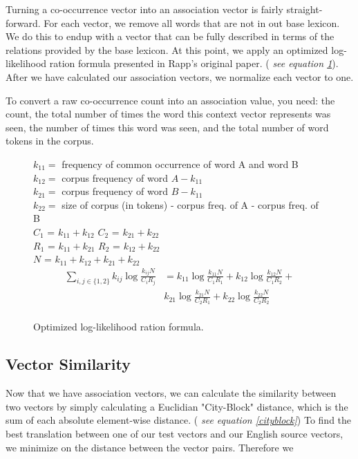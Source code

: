 \documentclass[12pt]{article}
\begin{document}
Turning a co-occurrence vector into an association vector is fairly straight-forward. For each vector, we remove all words that are not in out base lexicon. We do this to endup with a vector that can be fully described in terms of the relations provided by the base lexicon. At this point, we apply an optimized log-likelihood ration formula presented in Rapp's original paper. (\emph{ see equation \ref{loglike}}). After we have calculated our association vectors, we normalize each vector to one.

To convert a raw co-occurrence count into an association value, you need: the count, the total number of times the word this context vector represents was seen, the number of times this word was seen, and the total number of word tokens in the corpus.

\begin{figure}
$k_{11} =$ frequency of common occurrence of word A and word B \\
$k_{12} =$ corpus frequency of word $A - k_{11}$ \\
$k_{21} =$ corpus frequency of word $B - k_{11}$ \\
$k_{22} =$ size of corpus (in tokens) - corpus freq. of A - corpus freq. of B \\

$C_1$ = $k_{11} + k_{12}$ 
$C_2$ = $k_{21} + k_{22}$ \\
$R_1$ = $k_{11} + k_{21}$ 
$R_2$ = $k_{12} + k_{22}$ \\
$N$ = $k_{11} + k_{12} + k_{21} + k_{22}$ \\

  \begin{eqnarray*}
\sum_{i,j\in\{1,2\}} k_{ij}\log\frac{k_{ij}N}{C_iR_j} &= k_{11}\log\frac{k_{11}N}{C_1R_1} +  k_{12}\log\frac{k_{12}N}{C_1R_2} + \\
  & k_{21}\log\frac{k_{21}N}{C_2R_1} +  k_{22}\log\frac{k_{22}N}{C_2R_2} \\
  \end{eqnarray*}

  \caption{Optimized log-likelihood ration formula.}
  \label{loglike}
\end{figure}


\subsection{Vector Similarity}

Now that we have association vectors, we can calculate the similarity between two vectors by simply calculating a Euclidian "City-Block" distance, which is the sum of each absolute element-wise distance. (\emph{ see equation \ref{cityblock}}) To find the best translation between one of our test vectors and our English source vectors, we minimize on the distance between the vector pairs. Therefore we 
\end{document}
